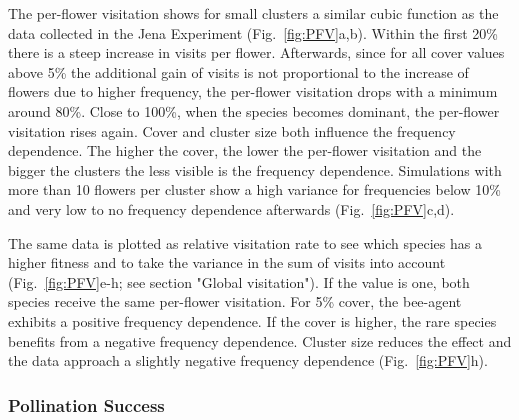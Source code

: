 The per-flower visitation shows for small clusters a similar cubic function as the data collected in the Jena Experiment (Fig.~\ref{fig:PFV}a,b). Within the first 20\% there is a steep increase in visits per flower. Afterwards, since for all cover values above 5\% the additional gain of visits is not proportional to the increase of flowers due to higher frequency, the per-flower visitation drops with a minimum around 80\%. Close to 100\%, when the species becomes dominant, the per-flower visitation rises again. Cover and cluster size both influence the frequency dependence. The higher the cover, the lower the per-flower visitation and the bigger the clusters the less visible is the frequency dependence. Simulations with more than 10 flowers per cluster show a high variance for frequencies below 10\% and very low to no frequency dependence afterwards (Fig.~\ref{fig:PFV}c,d). 

The same data is plotted as relative visitation rate to see which species has a higher fitness and to take the variance in the sum of visits into account (Fig.~\ref{fig:PFV}e-h; see section "Global visitation"). If the value is one, both species receive the same per-flower visitation. For 5\% cover, the bee-agent exhibits a positive frequency dependence. If the cover is higher, the rare species benefits from a negative frequency dependence. Cluster size reduces the effect and the data approach a slightly negative frequency dependence (Fig.~\ref{fig:PFV}h). 

\subsubsection*{Pollination Success}

